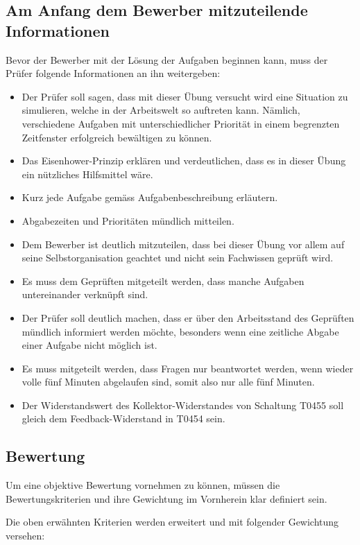 \subsection{Am Anfang dem Bewerber mitzuteilende Informationen}

Bevor der Bewerber mit der Lösung der Aufgaben beginnen kann, muss der Prüfer folgende Informationen an ihn weitergeben:

\begin{itemize}
\item Der Prüfer soll sagen, dass mit dieser Übung versucht wird eine Situation zu simulieren, welche in der Arbeitswelt so auftreten kann. Nämlich, verschiedene Aufgaben mit unterschiedlicher Priorität in einem begrenzten Zeitfenster erfolgreich bewältigen zu können.
\item Das Eisenhower-Prinzip erklären und verdeutlichen, dass es in dieser Übung ein nützliches Hilfsmittel wäre.
\item Kurz jede Aufgabe gemäss Aufgabenbeschreibung erläutern.
\item Abgabezeiten und Prioritäten mündlich mitteilen.
\item Dem Bewerber ist deutlich mitzuteilen, dass bei dieser Übung vor allem auf seine Selbstorganisation geachtet und nicht sein Fachwissen geprüft wird.  
\item Es muss dem Geprüften mitgeteilt werden, dass manche Aufgaben untereinander verknüpft sind.
\item Der Prüfer soll deutlich machen, dass er über den Arbeitsstand des Geprüften mündlich informiert werden möchte, besonders wenn eine zeitliche Abgabe einer Aufgabe nicht möglich ist.
\item Es muss mitgeteilt werden, dass Fragen nur beantwortet werden, wenn wieder volle fünf Minuten abgelaufen sind, somit also nur alle fünf Minuten.
\item Der Widerstandswert des Kollektor-Widerstandes von Schaltung T0455 soll gleich dem Feedback-Widerstand in T0454 sein.
\end{itemize}

\subsection{Bewertung}

Um eine objektive Bewertung vornehmen zu können, müssen die Bewertungskriterien und ihre Gewichtung im Vornherein klar definiert sein.

Die oben erwähnten Kriterien werden erweitert und mit folgender Gewichtung versehen:


